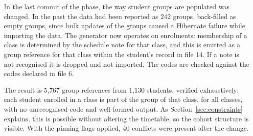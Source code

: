 In the last commit of the phase, the way student groups are populated was changed. In the past the
data had been reported as 242 groups, back-filled as empty groups, since bulk updates of the
groups caused a Hibernate failure while importing the data. The generator now operates on
enrolments: membership of a class is determined by the schedule note for that class, and this is
emitted as a group reference for that class within the student's record in file 14. If a note is
not recognised it is dropped and not imported. The codes are checked against the codes declared in
file 6.

The result is 5{,}767 group references from 1{,}130 students, verified exhaustively: each student
enrolled in a class is part of the group of that class, for all classes, with no unrecognised code
and well-formed output. As Section~\ref{sec:constraints} explains, this is possible without
altering the timetable, so the cohort structure is visible. With the pinning flags applied, 40
conflicts were present after the change.
